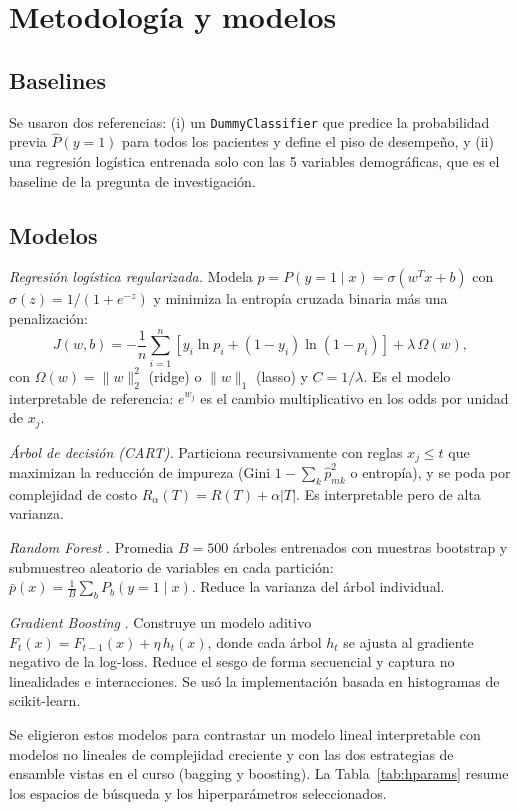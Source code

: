\documentclass[conference]{IEEEtran}
\begin{document}
\section{Metodología y modelos}
\label{sec:models}

\subsection{Baselines}
Se usaron dos referencias: (i) un \texttt{DummyClassifier} que predice la probabilidad previa $\hat P(y=1)$ para todos los pacientes y define el piso de desempeño, y (ii) una regresión logística entrenada solo con las 5 variables demográficas, que es el baseline de la pregunta de investigación.

\subsection{Modelos}
\textit{Regresión logística regularizada.} Modela $p=P(y=1\mid x)=\sigma(w^Tx+b)$ con $\sigma(z)=1/(1+e^{-z})$ y minimiza la entropía cruzada binaria más una penalización:
\begin{equation}
J(w,b)=-\frac1n\sum_{i=1}^{n}\left[y_i\ln p_i+(1-y_i)\ln(1-p_i)\right]+\lambda\,\Omega(w),
\end{equation}
con $\Omega(w)=\lVert w\rVert_2^2$ (ridge) o $\lVert w\rVert_1$ (lasso) y $C=1/\lambda$. Es el modelo interpretable de referencia: $e^{w_j}$ es el cambio multiplicativo en los odds por unidad de $x_j$.

\textit{Árbol de decisión (CART).} Particiona recursivamente con reglas $x_j\le t$ que maximizan la reducción de impureza (Gini $1-\sum_k\hat p_{mk}^2$ o entropía), y se poda por complejidad de costo $R_\alpha(T)=R(T)+\alpha\lvert T\rvert$. Es interpretable pero de alta varianza.

\textit{Random Forest} \cite{breiman2001}. Promedia $B=500$ árboles entrenados con muestras bootstrap y submuestreo aleatorio de variables en cada partición: $\bar p(x)=\frac1B\sum_b P_b(y=1\mid x)$. Reduce la varianza del árbol individual.

\textit{Gradient Boosting} \cite{friedman2001}. Construye un modelo aditivo $F_t(x)=F_{t-1}(x)+\eta\,h_t(x)$, donde cada árbol $h_t$ se ajusta al gradiente negativo de la log-loss. Reduce el sesgo de forma secuencial y captura no linealidades e interacciones. Se usó la implementación basada en histogramas de scikit-learn.

Se eligieron estos modelos para contrastar un modelo lineal interpretable con modelos no lineales de complejidad creciente y con las dos estrategias de ensamble vistas en el curso (bagging y boosting). La Tabla~\ref{tab:hparams} resume los espacios de búsqueda y los hiperparámetros seleccionados.
\end{document}
